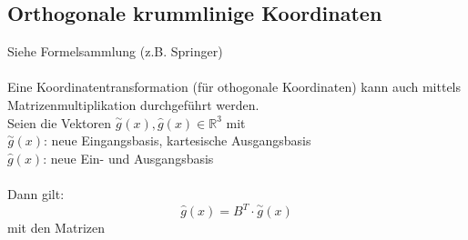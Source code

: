 \documentclass[a4paper,twocolumn,10pt]{article}
\begin{document}
\subsection{Orthogonale krummlinige Koordinaten}
Siehe Formelsammlung (z.B. Springer)\\\\
Eine Koordinatentransformation (für othogonale Koordinaten) kann auch mittels Matrizenmultiplikation durchgeführt werden.\\
Seien die Vektoren $\overset{\sim}{g}(x), \hat{g}(x)\in\mathbb{R}^3$ mit\\
$\overset{\sim}{g}(x)$: neue Eingangsbasis, kartesische Ausgangsbasis\\
$\hat{g}(x)$: neue Ein- und Ausgangsbasis\\\\
Dann gilt:
\begin{equation*}
\hat{g}(x)=B^T\cdot \overset{\sim}{g}(x)
\end{equation*}
mit den Matrizen
\end{document}
